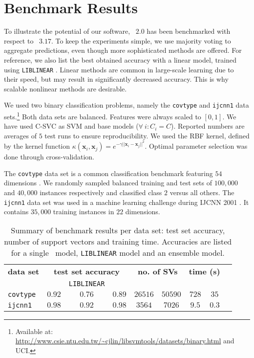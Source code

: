 \section{Benchmark Results} \label{bench}
To illustrate the potential of our software, \esvm\ $2.0$ has been benchmarked with respect to \libsvm\
$3.17$. To keep the experiments simple, we use majority voting to aggregate predictions, even though more sophisticated methods are offered. For reference, we also list the best obtained accuracy with a linear model, trained using \texttt{LIBLINEAR} \citep{Fan:2008:LLL:1390681.1442794}. Linear methods are common in large-scale learning due to their speed, but may result in significantly decreased accuracy. This is why scalable nonlinear methods are desirable.

We used two binary classification problems, namely the {\tt covtype} and {\tt ijcnn1} data sets.\footnote{Available
at: \url{http://www.csie.ntu.edu.tw/~cjlin/libsvmtools/datasets/binary.html}
and UCI.} Both data sets are balanced. Features were always scaled to $[0,1]$. We have
used C-SVC as SVM and base models ($\forall\ i: C_i=C$). Reported numbers are averages of $5$ test runs to ensure reproducibility. We used the RBF kernel, defined by the kernel function
$\kappa(\mathbf{x}_i,\mathbf{x}_j)=e^{-\gamma ||\mathbf{x}_i-\mathbf{x}_j||^2}$.
Optimal parameter selection was done through cross-validation.

The \texttt{covtype} data set is a common classification benchmark featuring
$54$ dimensions \citep{Blackard00covtype}. We randomly sampled balanced training
and test sets of $100,000$ and $40,000$ instances respectively and classified class $2$ versus all others. The \texttt{ijcnn1} data set was used in a machine learning challenge during IJCNN 2001 \citep{prokhorov2001ijcnn}. It contains $35,000$ training instances in $22$ dimensions.

\addtolength{\partopsep}{-5mm}
\begin{table}[!h]
\centering
\begin{tabular}{lcccccccc}
\toprule 
{\bfseries data set} & \multicolumn{3}{c}{\bfseries test set accuracy} & 
\multicolumn{2}{c}{\bfseries no. of SVs} & \multicolumn{2}{c}{\bfseries time
(s)}
\\
 & \libsvm & \texttt{LIBLINEAR} & \esvmshort & \libsvm & \esvmshort & \libsvm
 & \esvmshort \\
\midrule 
{\tt covtype} & $0.92$ & $0.76$ & $0.89$ & $26516$ & $50590$ & $728$ & $35$ \\
{\tt ijcnn1} & $0.98$ & $0.92$ & $0.98$ & $3564$ & $7026$ & $9.5$ & $0.3$ \\
\bottomrule
\end{tabular}
\caption{Summary of benchmark results per data set: test set accuracy, number of
support vectors and training time. Accuracies are listed for a single \libsvm\ model, \texttt{LIBLINEAR} model and an ensemble model.}
\label{resultstable}
\end{table}
\addtolength{\partopsep}{5mm}

